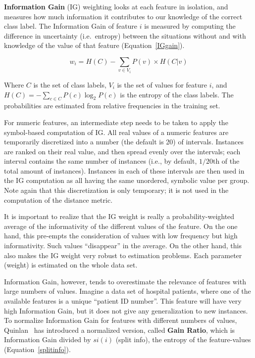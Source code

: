 \documentclass{report}
\begin{document}
{\bf Information Gain} (IG) weighting looks at each feature in
isolation, and measures how much information it contributes to our
knowledge of the correct class label. The Information Gain of feature
$i$ is measured by computing the difference in uncertainty
(i.e.\ entropy) between the situations without and with knowledge of
the value of that feature (Equation~\ref{IGgain}).

\begin{equation}
w_{i} = H(C) -  \sum_{v \in V_{i}} P(v) \times H(C|v)
\label{IGgain}
\end{equation}

Where $C$ is the set of class labels, $V_{i}$ is the set of values for
feature $i$, and $H(C) = - \sum_{c \in C} P(c) \log_{2} P(c)$ is the
entropy of the class labels. The probabilities are estimated from
relative frequencies in the training set. 

For numeric features, an intermediate step needs to be taken to apply
the symbol-based computation of IG. All real values of a numeric
features are temporarily discretized into a number (the default is 20)
of intervals. Instances are ranked on their real value, and then
spread evenly over the intervals; each interval contains the same
number of instances (i.e., by default, $1/20$th of the total amount of
instances). Instances in each of these intervals are then used in the
IG computation as all having the same unordered, symbolic value per
group. Note again that this discretization is only temporary; it is
not used in the computation of the distance metric.

It is important to realize that the IG weight is really a
probability-weighted average of the informativity of the different
values of the feature. On the one hand, this pre-empts the
consideration of values with low frequency but high
informativity. Such values ``disappear'' in the average. On the other
hand, this also makes the IG weight very robust to estimation
problems. Each parameter (weight) is estimated on the whole data set.

Information Gain, however, tends to overestimate the relevance of
features with large numbers of values. Imagine a data set of hospital
patients, where one of the available features is a unique ``patient ID
number''. This feature will have very high Information Gain, but it
does not give any generalization to new instances. To normalize
Information Gain for features with different numbers of values,
Quinlan~\cite{Quinlan93} has introduced a normalized version, called
{\bf Gain Ratio}, which is Information Gain divided by $si(i)$ (split info),
the entropy of the feature-values (Equation~\ref{splitinfo}).
\end{document}
